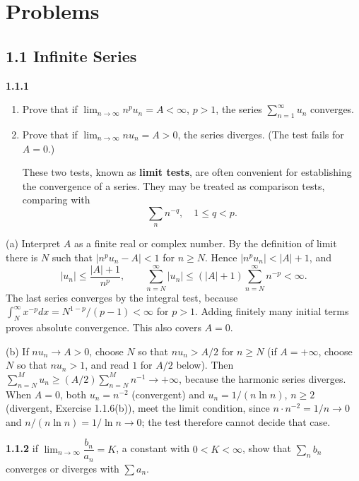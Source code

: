 
\section*{Problems}

\subsection*{1.1 Infinite Series}

\par\bigskip
\noindent\textbf{1.1.1}\quad
\begin{enumerate}
\item[(a)] Prove that if $\lim_{n\to\infty}n^{p}u_{n}=A<\infty$, $p>1$, the
  series $\sum_{n=1}^{\infty}u_{n}$ converges.
\item[(b)] Prove that if $\lim_{n\to\infty}nu_{n}=A>0$, the series diverges.
  (The test fails for $A=0$.)

  These two tests, known as \textbf{limit tests}, are often convenient for
  establishing the convergence of a series. They may be treated as comparison
  tests, comparing with
  \[
  \sum_{n}n^{-q},\quad 1\leq q<p.
  \]
\end{enumerate}
\solution
(a) Interpret $A$ as a finite real or complex number. By the definition of
limit there is $N$ such that $|n^p u_n-A|<1$ for $n\ge N$. Hence
$|n^pu_n|<|A|+1$, and
\[
 |u_n|\le\frac{|A|+1}{n^p},\qquad
 \sum_{n=N}^\infty |u_n|\le(|A|+1)\sum_{n=N}^\infty n^{-p}<\infty.
\]
The last series converges by the integral test, because $\int_N^\infty x^{-p}dx
=N^{1-p}/(p-1)<\infty$ for $p>1$. Adding finitely many initial terms proves absolute
convergence. This also covers $A=0$.

(b) If $nu_n\to A>0$, choose $N$ so that $nu_n>A/2$ for $n\ge N$
(if $A=+\infty$, choose $N$ so that $nu_n>1$, and read $1$ for $A/2$ below).
Then $\sum_{n=N}^M u_n\ge(A/2)\sum_{n=N}^M n^{-1}\to+\infty$,
because the harmonic series diverges.
When $A=0$, both $u_n=n^{-2}$ (convergent) and
$u_n=1/(n\ln n)$, $n\ge2$ (divergent, Exercise 1.1.6(b)), meet the limit
condition, since $n\cdot n^{-2}=1/n\to0$ and $n/(n\ln n)=1/\ln n\to0$;
the test therefore cannot decide that case.


\par\bigskip
\noindent\textbf{1.1.2}\quad {} if
$\lim_{n\to\infty}\dfrac{b_{n}}{a_{n}}=K$, a constant with $0<K<\infty$, show
that $\sum_{n}b_{n}$ converges or diverges with $\sum a_{n}$.

